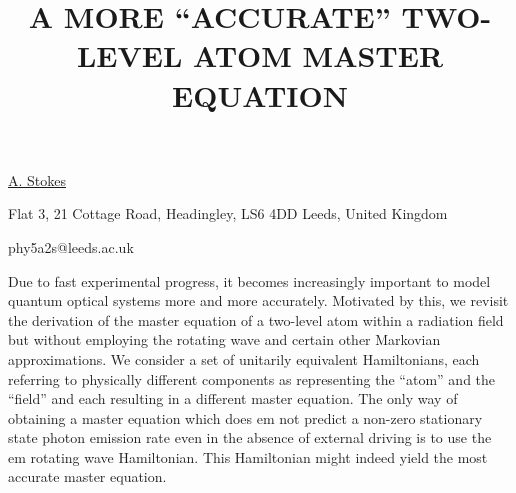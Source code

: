 \title{A MORE ``ACCURATE'' TWO-LEVEL ATOM MASTER EQUATION}

\underline{A. Stokes} 

{\normalsize{\vspace{-4mm}
Flat 3, 21 Cottage Road, Headingley, LS6 4DD Leeds, United Kingdom

\email phy5a2s@leeds.ac.uk}}

Due to fast experimental progress, it becomes increasingly important to model quantum optical systems more and more accurately.
Motivated by this, we revisit the derivation of the master equation of a two-level atom within a radiation field but without employing
the rotating wave and certain other Markovian approximations. We consider a set of unitarily equivalent Hamiltonians, each referring
to physically different components as representing the ``atom'' and the ``field'' and each resulting in a different master equation.
The only way of obtaining a master equation which does {em not} predict a non-zero stationary state photon emission rate even in
the absence of external driving is to use the {em rotating wave} Hamiltonian. This Hamiltonian might indeed yield the most accurate
master equation.

\vspace{\baselineskip} 